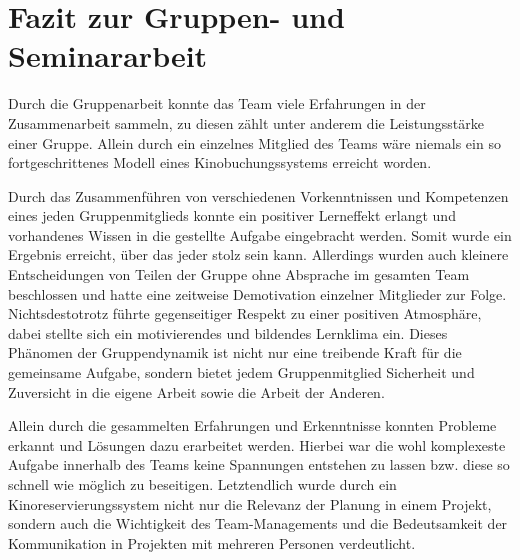 \section{Fazit zur Gruppen- und Seminararbeit}
\multipleauthorsection{\authorRF}{\authorEJ}

Durch die Gruppenarbeit konnte das Team viele Erfahrungen in der Zusammenarbeit sammeln, zu diesen zählt unter anderem die Leistungsstärke einer Gruppe.
Allein durch ein einzelnes Mitglied des Teams wäre niemals ein so fortgeschrittenes Modell eines Kinobuchungssystems erreicht worden.

Durch das Zusammenführen von verschiedenen Vorkenntnissen und Kompetenzen eines jeden Gruppenmitglieds konnte ein positiver Lerneffekt erlangt und vorhandenes Wissen in die gestellte Aufgabe eingebracht werden.
Somit wurde ein Ergebnis erreicht, über das jeder stolz sein kann.
Allerdings wurden auch kleinere Entscheidungen von Teilen der Gruppe ohne Absprache im gesamten Team beschlossen und hatte eine zeitweise Demotivation einzelner Mitglieder zur Folge.
Nichtsdestotrotz führte gegenseitiger Respekt zu einer positiven Atmosphäre, dabei stellte sich ein motivierendes und bildendes Lernklima ein.
Dieses Phänomen der Gruppendynamik ist nicht nur eine treibende Kraft für die gemeinsame Aufgabe, sondern bietet jedem Gruppenmitglied Sicherheit und Zuversicht in die eigene Arbeit sowie die Arbeit der Anderen.

Allein durch die gesammelten Erfahrungen und Erkenntnisse konnten Probleme erkannt und Lösungen dazu erarbeitet werden.
Hierbei war die wohl komplexeste Aufgabe innerhalb des Teams keine Spannungen entstehen zu lassen bzw. diese so schnell wie möglich zu beseitigen.
Letztendlich wurde durch ein Kinoreservierungssystem nicht nur die Relevanz der Planung in einem Projekt, sondern auch die Wichtigkeit des Team-Managements und die Bedeutsamkeit der Kommunikation in Projekten mit mehreren Personen verdeutlicht.
